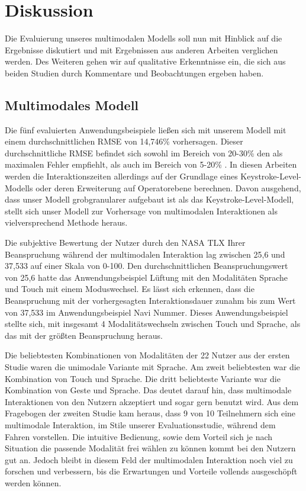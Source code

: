\clearpage
\section[Diskussion]{Diskussion}
Die Evaluierung unseres multimodalen Modells soll nun mit Hinblick auf die Ergebnisse diskutiert und mit Ergebnissen aus anderen Arbeiten verglichen werden. Des Weiteren gehen wir auf qualitative Erkenntnisse ein, die sich aus beiden Studien durch Kommentare und Beobachtungen ergeben haben.

\subsection[Modell]{Multimodales Modell}
Die fünf evaluierten Anwendungsbeispiele ließen sich mit unserem Modell mit einem durchschnittlichen RMSE von 14,746\% vorhersagen. Dieser durchschnittliche RMSE befindet sich sowohl im Bereich von 20-30\% den \citet{Card_1980} als maximalen Fehler empfiehlt, als auch im Bereich von 5-20\% \citep{Luo_2005,Teo:2006}. 
In diesen Arbeiten werden die Interaktionszeiten allerdings auf der Grundlage eines Keystroke-Level-Modells oder deren Erweiterung auf Operatorebene berechnen. 
Davon ausgehend, dass unser Modell grobgranularer aufgebaut ist als das Keystroke-Level-Modell, stellt sich unser Modell zur Vorhersage von multimodalen Interaktionen als vielversprechend Methode heraus. 

Die subjektive Bewertung der Nutzer durch den NASA TLX Ihrer Beanspruchung während der multimodalen Interaktion lag zwischen 25,6 und 37,533 auf einer Skala von 0-100. 
Den durchschnittlichen Beanspruchungswert von 25,6 hatte das Anwendungsbeispiel Lüftung mit den Modalitäten Sprache und Touch mit einem Moduswechsel. 
Es lässt sich erkennen, dass die Beanspruchung mit der vorhergesagten Interaktionsdauer zunahm bis zum Wert von 37,533 im Anwendungsbeispiel Navi Nummer. 
Dieses Anwendungsbeispiel stellte sich, mit insgesamt 4 Modalitätswechseln zwischen Touch und Sprache, als das mit der größten Beanspruchung heraus.  

Die beliebtesten Kombinationen von Modalitäten der 22 Nutzer aus der ersten Studie waren die unimodale Variante mit Sprache. 
Am zweit beliebtesten war die Kombination von Touch und Sprache. 
Die dritt beliebteste Variante war die Kombination von Geste und Sprache. 
Das deutet darauf hin, dass multimodale Interaktionen von den Nutzern akzeptiert und sogar gern benutzt wird. 
Aus dem Fragebogen der zweiten Studie kam heraus, dass 9 von 10 Teilnehmern sich eine multimodale Interaktion, im Stile unserer Evaluationsstudie, während dem Fahren vorstellen. 
Die intuitive Bedienung, sowie dem Vorteil sich je nach Situation die passende Modalität frei wählen zu können kommt bei den Nutzern gut an. 
Jedoch bleibt in diesem Feld der multimodalen Interaktion noch viel zu forschen und verbessern, bis die Erwartungen und Vorteile vollends ausgeschöpft werden können.

